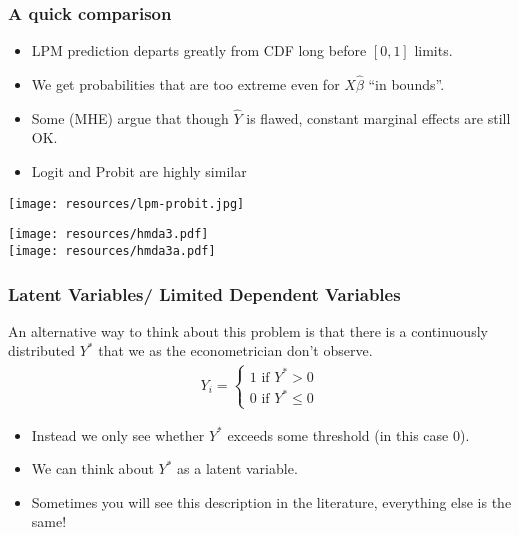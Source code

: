 \documentclass[aspectratio=169]{beamer}
\begin{document}
\begin{frame}
\frametitle{A quick comparison}
\begin{itemize}
\item LPM prediction departs greatly from CDF long before $[0,1]$ limits.
\item We get probabilities that are too extreme even for $X\hat{\beta}$ ``in bounds''.
\item Some (MHE) argue that though $\hat{Y}$ is flawed, constant marginal effects are still OK.
\item Logit and Probit are highly similar
\end{itemize}
\begin{center}
\texttt{[image: resources/lpm-probit.jpg]}
\end{center}
\end{frame}

\begin{frame}
\begin{center}
\texttt{[image: resources/hmda3.pdf]}\\
\texttt{[image: resources/hmda3a.pdf]}\\
\end{center}
\end{frame}

\begin{frame}
\frametitle{Latent Variables/ Limited Dependent Variables}
An alternative way to think about this problem is that there is a continuously distributed $Y^{*}$ that we as the econometrician don't observe.
\begin{eqnarray*}
Y_i =
\begin{cases}
1 \mbox{ if } Y^{*} >0 \\
0 \mbox{ if } Y^{*} \leq 0
\end{cases}
\end{eqnarray*}
\begin{itemize}
\item Instead we only see whether $Y^{*}$ exceeds some threshold (in this case $0$).
\item We can think about $Y^{*}$ as a \alert{latent variable}.
\item Sometimes you will see this description in the literature, everything else is the same!
\end{itemize}
\end{frame}
\end{document}
